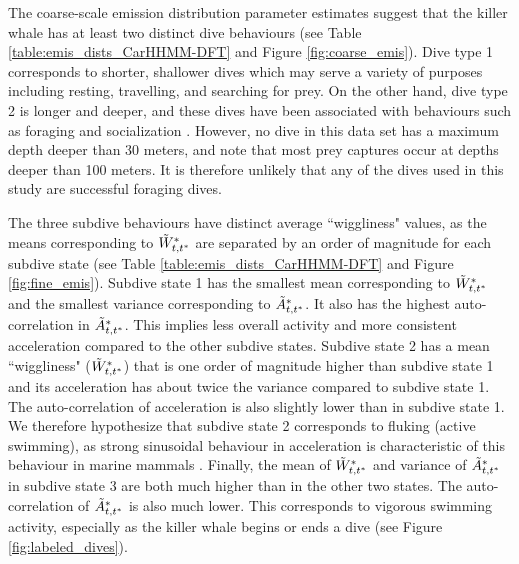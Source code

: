 The coarse-scale emission distribution parameter estimates suggest that the killer whale has at least two distinct dive behaviours (see Table \ref{table:emis_dists_CarHHMM-DFT} and Figure \ref{fig:coarse_emis}). 
Dive type 1 corresponds to shorter, shallower dives which may serve a variety of purposes including resting, travelling, and searching for prey.
On the other hand, dive type 2 is longer and deeper, and these dives have been associated with behaviours such as foraging and socialization \citep{Tennessen:2019b}. However, no dive in this data set has a maximum depth deeper than 30 meters, and \citet{Wright:2017} note that most prey captures occur at depths deeper than 100 meters. It is therefore unlikely that any of the dives used in this study are successful foraging dives.

The three subdive behaviours have distinct average ``wiggliness" values, as the means corresponding to $\tilde{W}^*_{t,t^*}$ are separated by an order of magnitude for each subdive state (see Table \ref{table:emis_dists_CarHHMM-DFT} and Figure \ref{fig:fine_emis}). 
Subdive state 1 has the smallest mean corresponding to $\tilde{W}^*_{t,t^*}$ and the smallest variance corresponding to $\tilde{A}^*_{t,t^*}$. It also has the highest auto-correlation in $\tilde{A}^*_{t,t^*}$. This implies less overall activity and more consistent acceleration compared to the other subdive states. 
Subdive state 2 has a mean ``wiggliness" ($\tilde{W}^*_{t,t^*}$) that is one order of magnitude higher than subdive state 1 and its acceleration has about twice the variance compared to subdive state 1. The auto-correlation of acceleration is also slightly lower than in subdive state 1. We therefore hypothesize that subdive state 2 corresponds to fluking (active swimming), as strong sinusoidal behaviour in acceleration is characteristic of this behaviour in marine mammals \citep{Simon:2012}.
Finally, the mean of $\tilde{W}^*_{t,t^*}$ and variance of $\tilde{A}^*_{t,t^*}$ in subdive state 3 are both much higher than in the other two states. The auto-correlation of $\tilde{A}^*_{t,t^*}$ is also much lower. This corresponds to vigorous swimming activity, especially as the killer whale begins or ends a dive (see Figure \ref{fig:labeled_dives}). 

